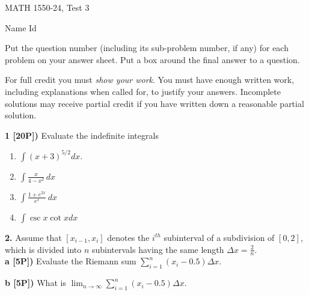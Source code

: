 \documentclass[12pt]{article}
\begin{document}
\begin{large}
\begin{bf}
\hspace{.75in}
{MATH 1550-24, Test 3} %
\hspace{1in}
\parbox{1in}{ Name \newline Id}
\end{bf}
\end{large}

\vspace{0.2in}

Put the question number (including its sub-problem number, if any) for each 
problem on your answer sheet. 
Put a box around the final answer to a question.

\vspace*{.02in}
For full credit you must \emph{show your work}. You must have enough
written work, including explanations when called for, to justify your
answers. Incomplete solutions may receive partial credit if you have
written down a reasonable partial solution. %
                 

\vspace{.25in}

{\bf 1 [20P])} Evaluate the indefinite integrals
\begin{enumerate}
\item \; ${\displaystyle \int (x+3)^{5/2}dx }$.
\item \; ${\displaystyle \int \frac{x}{4 - x^2}\, dx \,  }$
\item \; ${\displaystyle \int \frac{1 + e^{2x}}{e^{x}}\, dx \, }$
\item \; ${\displaystyle \int  \csc x\cot x dx} $
\end{enumerate}


\newpage

{\bf 2.} Assume that ${\displaystyle [x_{i-1},x_i]}$ denotes the
$i^{th}$ subinterval of a subdivision of $[0,2]$,
which is divided into $n$ subintervals having the same length ${\displaystyle
\Delta x = \frac{2}{n}}$. \\
{\bf a [5P])} Evaluate the Riemann sum ${\displaystyle
\sum_{i=1}^n \left(x_i -0.5\right)\Delta x}$.

{\bf b [5P])} What is ${\displaystyle
\lim_{n\to \infty}
\sum_{i=1}^n \left(x_i -0.5\right)\Delta x}$.
\end{document}
